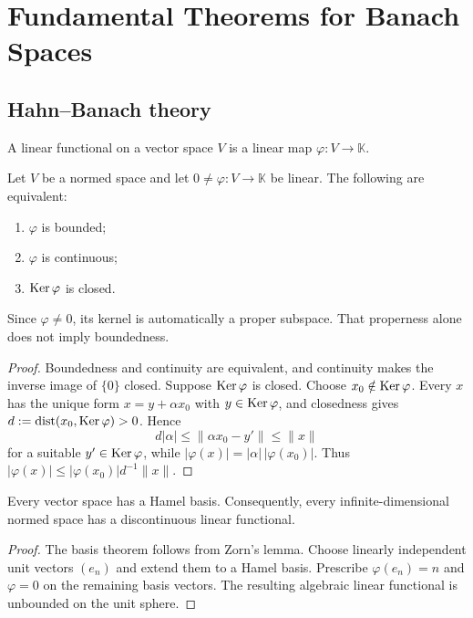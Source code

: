 \chapter{Fundamental Theorems for Banach Spaces}

\section{Hahn--Banach theory}

\begin{notedefinition}
A linear functional on a vector space $V$ is a linear map
$\varphi\colon V\to\mathbb K$.
\end{notedefinition}

\begin{notetheorem}
Let $V$ be a normed space and let $0\ne\varphi\colon V\to\mathbb K$ be
linear.  The following are equivalent:
\begin{enumerate}
  \item $\varphi$ is bounded;
  \item $\varphi$ is continuous;
  \item $\operatorname{Ker}\varphi$ is closed.
\end{enumerate}
Since $\varphi\ne0$, its kernel is automatically a proper subspace.  That
properness alone does not imply boundedness.
\end{notetheorem}

\begin{proof}
Boundedness and continuity are equivalent, and continuity makes the inverse
image of $\{0\}$ closed.  Suppose $\operatorname{Ker}\varphi$ is closed.  Choose
$x_0\notin\operatorname{Ker}\varphi$.  Every $x$ has the unique form
$x=y+\alpha x_0$ with $y\in\operatorname{Ker}\varphi$, and closedness gives
$d:=\operatorname{dist}(x_0,\operatorname{Ker}\varphi)>0$.  Hence
\[
  d|\alpha|
  \le\|\alpha x_0-y'\|
  \le\|x\|
\]
for a suitable $y'\in\operatorname{Ker}\varphi$, while
$|\varphi(x)|=|\alpha|\,|\varphi(x_0)|$.  Thus
$|\varphi(x)|\le |\varphi(x_0)|d^{-1}\|x\|$.
\end{proof}

\begin{notetheorem}
Every vector space has a Hamel basis.  Consequently, every
infinite-dimensional normed space has a discontinuous linear functional.
\end{notetheorem}

\begin{proof}
The basis theorem follows from Zorn's lemma.  Choose linearly independent unit
vectors $(e_n)$ and extend them to a Hamel basis.  Prescribe
$\varphi(e_n)=n$ and $\varphi=0$ on the remaining basis vectors.  The
resulting algebraic linear functional is unbounded on the unit sphere.
\end{proof}

